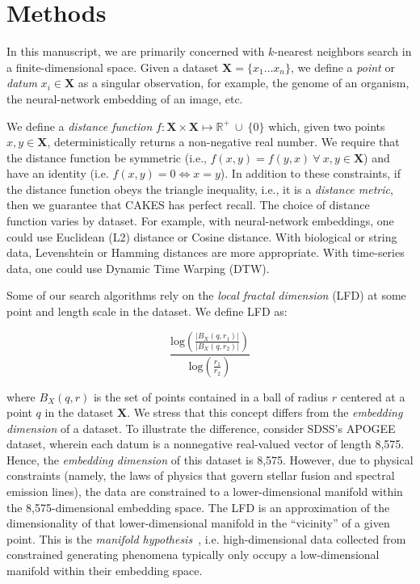 \section{Methods}
\label{sec:methods}

In this manuscript, we are primarily concerned with $k$-nearest neighbors search in a finite-dimensional space.
Given a dataset $\textbf{X} = \{x_1 \dots x_n\}$, we define a \emph{point} or \emph{datum} $x_i \in \textbf{X}$ as a singular observation, for example, the genome of an organism, the neural-network embedding of an image, etc.

We define a \emph{distance function} $f : \textbf{X} \times \textbf{X} \mapsto \mathbb{R}^+ \ \cup \ \{0\}$ which, given two points $x, y \in \textbf{X}$, deterministically returns a non-negative real number.
We require that the distance function be symmetric (i.e., $f(x, y) = f(y, x) \ \forall \ x, y \in \textbf{X}$) and have an identity (i.e. $f(x, y) = 0 \iff x = y$). 
In addition to these constraints, if the distance function obeys the triangle inequality, i.e., it is a \emph{distance metric}, then we guarantee that CAKES has perfect recall. 
The choice of distance function varies by dataset.
For example, with neural-network embeddings, one could use Euclidean (L2) distance or Cosine distance.
With biological or string data, Levenshtein or Hamming distances are more appropriate.
With time-series data, one could use Dynamic Time Warping (DTW).

Some of our search algorithms rely on the \emph{local fractal dimension} (LFD) at some point and length scale in the dataset.
We define LFD as:

\begin{equation}
    \frac{\text{log}(\frac{|B_X(q, r_1)|}{|B_X(q, r_2)|})}{\text{log}(\frac{r_1}{r_2}) }
    \label{eq:methods:lfd-original}
\end{equation}

where $B_X(q, r)$ is the set of points contained in a ball of radius $r$ centered at a point $q$ in the dataset $\textbf{X}$.
We stress that this concept differs from the \emph{embedding dimension} of a dataset.
To illustrate the difference, consider SDSS's APOGEE dataset, wherein each datum is a nonnegative real-valued vector of length 8,575.
Hence, the \emph{embedding dimension} of this dataset is 8,575. 
However, due to physical constraints (namely, the laws of physics that govern stellar fusion and spectral emission lines), the data are constrained to a lower-dimensional manifold within the 8,575-dimensional embedding space.
The LFD is an approximation of the dimensionality of that lower-dimensional manifold in the ``vicinity'' of a given point.
This is the \emph{manifold hypothesis}~\cite{fefferman2016testing}, i.e. high-dimensional data collected from constrained generating phenomena typically only occupy a low-dimensional manifold within their embedding space.


